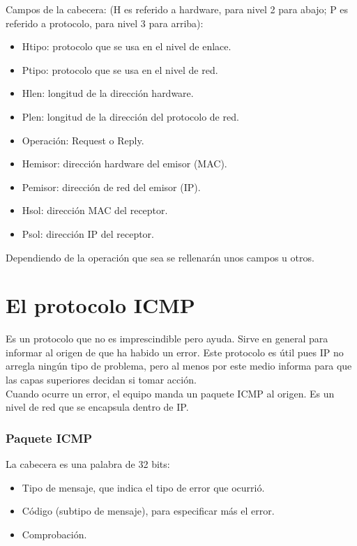 \noindent Campos de la cabecera: (H es referido a hardware, para nivel 2 para abajo; P es referido a protocolo, para nivel 3 para arriba):
\begin{itemize}
    \item Htipo: protocolo que se usa en el nivel de enlace.
    \item Ptipo: protocolo que se usa en el nivel de red.
    \item Hlen: longitud de la dirección hardware.
    \item Plen: longitud de la dirección del protocolo de red.
    \item Operación: Request o Reply.
    \item Hemisor: dirección hardware del emisor (MAC).
    \item Pemisor: dirección de red del emisor (IP).
    \item Hsol: dirección MAC del receptor.
    \item Psol: dirección IP del receptor.
\end{itemize}

Dependiendo de la operación que sea se rellenarán unos campos u otros.

\section{El protocolo ICMP}
Es un protocolo que no es imprescindible pero ayuda. Sirve en general para informar al origen de que ha habido un error. Este protocolo es útil pues IP no arregla ningún tipo de problema, pero al menos por este medio informa para que las capas superiores decidan si tomar acción.\\

Cuando ocurre un error, el equipo manda un paquete ICMP al origen. Es un nivel de red que se encapsula dentro de IP. 

\subsubsection{Paquete ICMP}
La cabecera es una palabra de 32 bits:
\begin{itemize}
    \item Tipo de mensaje, que indica el tipo de error que ocurrió.
    \item Código (subtipo de mensaje), para especificar más el error.
    \item Comprobación.
\end{itemize}

